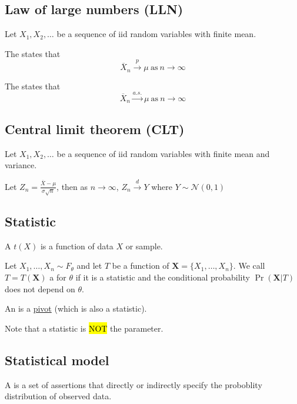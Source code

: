 \subsection{Law of large numbers (LLN)}
	Let $X_1, X_2, \ldots$ be a sequence of iid random variables with finite mean.

	The  states that
		\[\overline{X}_n\xrightarrow{p}\mu~\textrm{as}~n\to\infty\]

	The  states that
		\[\overline{X}_n\xrightarrow{a.s.}\mu~\textrm{as}~n\to\infty\]

\subsection{Central limit theorem (CLT)}
	Let $X_1, X_2, \ldots$ be a sequence of iid random variables with finite mean and variance.

	Let $Z_n=\frac{\overline{X}-\mu}{\sigma\sqrt{n}}$,
	then as $n \to \infty$, $Z_n\xrightarrow{d} Y$ where $Y \sim \mathcal{N}(0,1)$

\subsection{Statistic}
	A  $t(X)$ is a function of data $X$ or sample.

	Let $X_1, \ldots, X_n \sim F_\theta$ and let $T$ be a function of $\mathbf{X}=\{X_1, \ldots, X_n\}$.
	We call $T=T(\mathbf{X})$ a  for $\theta$ if it is a statistic and the conditional probability $\Pr(\mathbf{X}|T)$ does not depend on $\theta$.

	An  is a \hyperref[concept:pivot]{pivot} (which is also a statistic).

	Note that a statistic is \hl{NOT} the parameter.

\subsection{Statistical model}
	A  is a set of assertions that directly or indirectly specify the proboblity distribution of observed data.